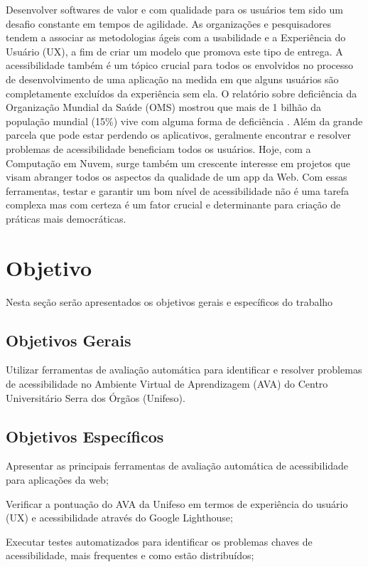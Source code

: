 \documentclass[
	12pt,				%
	openright,			%
	oneside,			%
	a4paper,			%
	chapter=TITLE,		%
	section=TITLE,		%
	subsection=TITLE,	%
	subsubsection=TITLE,%
	english,			%
	brazil				%
	]{abntex2}
\theoremstyle{definition}
\begin{document}
Desenvolver softwares de valor e com qualidade para os usuários tem sido um desafio constante em tempos de agilidade. As organizações e pesquisadores tendem a associar as metodologias ágeis com a usabilidade e a Experiência do Usuário (UX), a fim de criar um modelo que promova este tipo de entrega. A acessibilidade também é um tópico crucial para todos os envolvidos no processo de desenvolvimento de uma aplicação na medida em que alguns usuários são completamente excluídos da experiência sem ela. O relatório sobre deficiência da Organização Mundial da Saúde (OMS) mostrou que mais de 1 bilhão da população mundial (15\%) vive com alguma forma de deficiência \cite{schiariti2020human}. Além da grande parcela que pode estar perdendo os aplicativos, geralmente encontrar e resolver problemas de acessibilidade beneficiam todos os usuários. Hoje, com a Computação em Nuvem, surge também um crescente interesse em projetos que visam abranger todos os aspectos da qualidade de um app da Web. Com essas ferramentas, testar e garantir um bom nível de acessibilidade não é uma tarefa complexa mas com certeza é um fator crucial e determinante
para criação de práticas mais democráticas.
    
\section{Objetivo}
 
Nesta seção serão apresentados os objetivos gerais e específicos do trabalho

\subsection{Objetivos Gerais}

Utilizar ferramentas de avaliação automática para identificar e resolver problemas de acessibilidade no Ambiente Virtual de Aprendizagem (AVA) do Centro Universitário Serra dos Órgãos (Unifeso).

\subsection{Objetivos Específicos}

Apresentar as principais ferramentas de avaliação automática de acessibilidade para aplicações da web;
    
Verificar a pontuação do AVA da Unifeso em termos de experiência do usuário (UX) e acessibilidade através do Google Lighthouse;

Executar testes automatizados para identificar os problemas chaves de acessibilidade, mais frequentes e como estão distribuídos;
\end{document}
